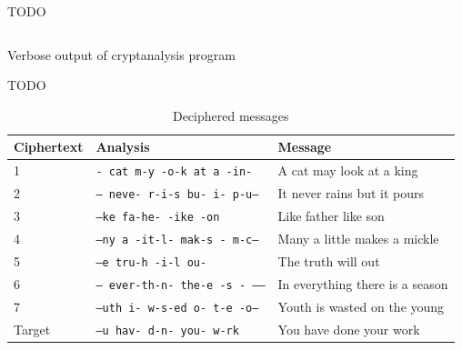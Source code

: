 \documentclass[a4paper]{article}
\begin{document}
TODO

\begin{listing}
  \inputminted[frame=lines,fontsize=\scriptsize]{text}{listings/ex3_cryptanalysis_1.txt}
  \caption{Verbose output of cryptanalysis program}
  \label{listing:cryptanalysis_verbose}
\end{listing}

TODO

\begin{table}[h]
  \centering
  \begin{tabular}{lll}
    \hline
    Ciphertext  & Analysis                                  & Message                         \\
    \hline
    1           & \texttt{- cat m-y -o-k at a -in-}         & A cat may look at a king        \\
    2           & \texttt{-- neve- r-i-s bu- i- p-u--}      & It never rains but it pours     \\
    3           & \texttt{--ke fa-he- -ike -on}             & Like father like son            \\
    4           & \texttt{--ny a -it-l- mak-s - m-c---}     & Many a little makes a mickle    \\
    5           & \texttt{--e tru-h -i-l ou-}               & The truth will out              \\
    6           & \texttt{-- ever-th-n- the-e -s - ------}  & In everything there is a season \\
    7           & \texttt{--uth i- w-s-ed o- t-e -o---}     & Youth is wasted on the young    \\
    Target      & \texttt{--u hav- d-n- you- w-rk}          & You have done your work         \\
    \hline
  \end{tabular}
  \caption{Deciphered messages}
  \label{tab:deciphered_messages}
\end{table}
\end{document}
